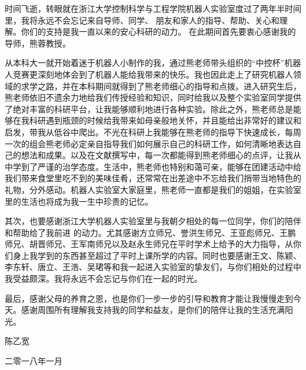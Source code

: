 \begin{thanks}
时间飞逝，转眼就在浙江大学控制科学与工程学院机器人实验室度过了两年半时间里，我将永远不会忘记来自导师、同学、 朋友和家人的指导、帮助、关心和理解。你们的支持是我一直以来的安心科研的动力。
在此期间首先要衷心感谢我的导师，熊蓉教授。

从本科大一就开始着迷于机器人小制作的我，通过熊老师带头组织的“中控杯”机器人竞赛更深刻地体会到了机器人能给我带来的快乐。我也因此走上了研究机器人领域的求学之路，并在本科期间就得到了熊老师细心的指导和点拨。进入研究生后，熊老师依旧不遗余力地给我们传授经验和知识，同时给我以及整个实验室同学提供了绝对丰富的科研平台，让我能够顺利地进行各种实验。除此之外，熊老师总是能够在我科研遇到瓶颈的时候给我带来如母亲般地关怀，并且能给出非常好的建议和启发，带我从低谷中爬出。不光在科研上我能够在熊老师的指导下快速成长，每周一次的组会熊老师必定亲自指导我们如何展示自己的科研工作，如何清晰地表达自己的想法和成果。以及在文献撰写中，每一次都能得到熊老师细心的点评，让我从中学到了严谨的治学态度。生活中，熊老师也特别和蔼可亲，能够在团建活动中给我们带来食堂里吃不到的美味佳肴，还常常在出差途中不忘给我们捎带当地特色的礼物，分外感动。机器人实验室大家庭里，熊老师一直都是我们的姐姐，在实验室里的生活也将成为我一生中珍贵的记忆。

其次，也要感谢浙江大学机器人实验室里与我朝夕相处的每一位同学，你们的陪伴和帮助给了我前进 的动力。尤其感谢方立师兄、誉洪生师兄、王亚彪师兄、王鹏师兄、胡晋师兄、王军南师兄以及赵永生师兄在平时学术上给予的大力指导，从你们身上我学到的东西甚至超过了平时上课所学的内容。同时也要感谢王文、陈颖、李东轩、唐立、王浩、吴珺等和我一起进入实验室的挚友们，与你们相处的过程中我受益颇深。我将永远不会忘记与你们在一起的时光。

最后，感谢父母的养育之恩，也是你们一步一步的引导和教育才能让我慢慢走到今天。感谢周围所有理解我支持我的同学和益友，是你们的陪伴让我的生活充满阳光。

\begin{flushright}
陈乙宽

二零一八年一月
\end{flushright}
\end{thanks}
